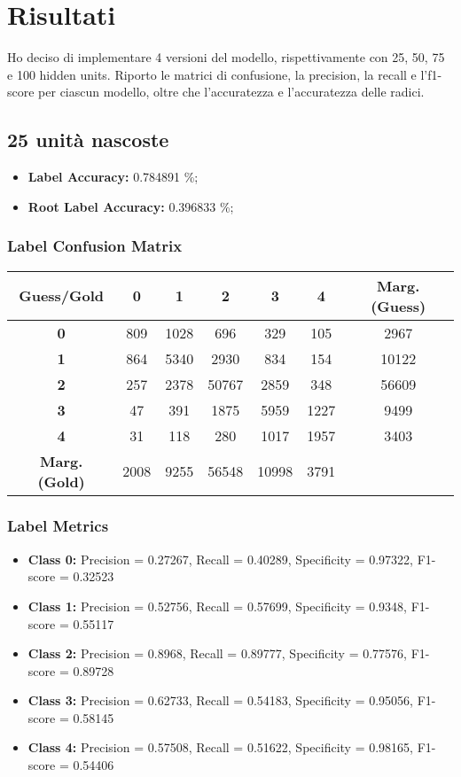 \section{Risultati}

Ho deciso di implementare 4 versioni del modello, rispettivamente con 25, 50, 75
e 100 hidden units. Riporto le matrici di confusione, la precision, la recall e 
l'f1-score per ciascun modello, oltre che l'accuratezza e l'accuratezza delle 
radici.

\subsection{25 unità nascoste}

\begin{itemize}
    \item \textbf{Label Accuracy:} 0.784891 \%;
    \item \textbf{Root Label Accuracy:} 0.396833 \%;
\end{itemize}

\subsubsection{Label Confusion Matrix}
\begin{table}[h]
\centering
\begin{tabular}{c|ccccc|c}
\textbf{Guess/Gold} & \textbf{0} & \textbf{1} & \textbf{2} & \textbf{3} & \textbf{4} & \textbf{Marg. (Guess)} \\
\hline
\textbf{0} & 809 & 1028 & 696 & 329 & 105 & 2967 \\
\textbf{1} & 864 & 5340 & 2930 & 834 & 154 & 10122 \\
\textbf{2} & 257 & 2378 & 50767 & 2859 & 348 & 56609 \\
\textbf{3} & 47 & 391 & 1875 & 5959 & 1227 & 9499 \\
\textbf{4} & 31 & 118 & 280 & 1017 & 1957 & 3403 \\
\hline
\textbf{Marg. (Gold)} & 2008 & 9255 & 56548 & 10998 & 3791 & \\
\end{tabular}
\end{table}

\subsubsection{Label Metrics}
\begin{itemize}
    \item \textbf{Class 0:} Precision = 0.27267, Recall = 0.40289, Specificity = 0.97322, F1-score = 0.32523
    \item \textbf{Class 1:} Precision = 0.52756, Recall = 0.57699, Specificity = 0.9348, F1-score = 0.55117
    \item \textbf{Class 2:} Precision = 0.8968, Recall = 0.89777, Specificity = 0.77576, F1-score = 0.89728
    \item \textbf{Class 3:} Precision = 0.62733, Recall = 0.54183, Specificity = 0.95056, F1-score = 0.58145
    \item \textbf{Class 4:} Precision = 0.57508, Recall = 0.51622, Specificity = 0.98165, F1-score = 0.54406
\end{itemize}

